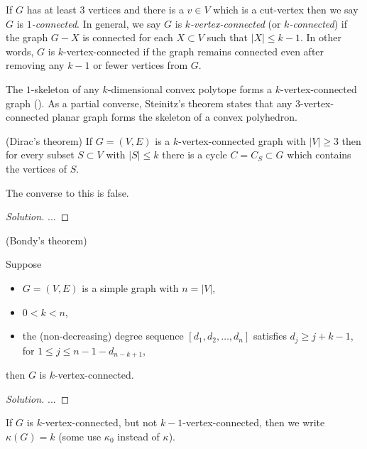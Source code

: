 If $G$ has at least $3$ vertices and there is a $v\in V$
which is a cut-vertex then we say $G$ is {\it $1$-connected}.
 In general, we say $G$ is {\it $k$-vertex-connected} (or
{\it $k$-connected})
if the graph $G-X$ is connected for each $X\subset V$
such that $|X|\leq k-1$.
In other words, $G$ is $k$-vertex-connected
if the graph remains connected even after removing 
any $k-1$ or fewer vertices from $G$.

\begin{example}
The $1$-skeleton of any $k$-dimensional convex polytope forms 
a $k$-vertex-connected graph 
(\cite{Balinski1961}). As a partial converse, Steinitz's theorem 
states that any $3$-vertex-connected planar graph forms 
the skeleton of a convex polyhedron.

\end{example}


\begin{theorem}
(Dirac's theorem)
{\rm
If $G=(V,E)$ is a $k$-vertex-connected graph with
$|V|\geq 3$ then for every subset $S\subset V$ with
$|S|\leq k$ there is a cycle $C=C_S\subset G$ which contains
the vertices of $S$.
}
\end{theorem}

The converse to this is false.

\begin{proof}[Solution]

...
\end{proof}


\begin{theorem}
(Bondy's theorem)
{\rm
Suppose 

\begin{itemize}
\item
$G=(V,E)$ is a simple graph with $n=|V|$, 
\item
$0<k<n$,
\item
the (non-decreasing) degree sequence 
$[d_1,d_2,\dots, d_n]$ satisfies
$d_j\geq j+k-1$, for $1\leq j\leq n-1-d_{n-k+1}$,
\end{itemize}
then $G$ is $k$-vertex-connected.
}
\end{theorem}

\begin{proof}[Solution]

...
\end{proof}


If $G$ is $k$-vertex-connected, but not
$k-1$-vertex-connected, then we write $\kappa(G)=k$
(some use $\kappa_0$ instead of $\kappa$).

